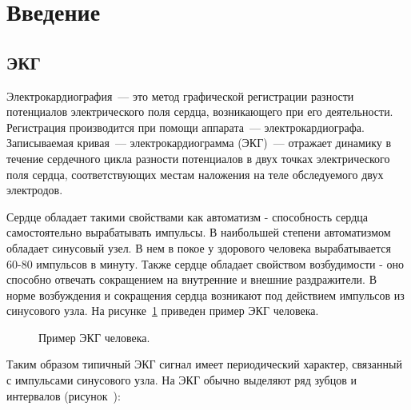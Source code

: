 \documentclass[a4paper,12pt]{extarticle}
\begin{document}
\newpage
\section{Введение}

\subsection{ЭКГ}

Электрокардиография\cite{ClinicalECG93}~--- это метод графической регистрации разности потенциалов электрического поля сердца, возникающего при его деятельности. Регистрация производится при помощи аппарата~--- электрокардиографа. Записываемая кривая~--- электрокардиограмма (ЭКГ)~--- отражает динамику в течение сердечного цикла разности потенциалов в двух точках электрического поля сердца, соответствующих местам наложения на теле обследуемого двух электродов.

Сердце обладает такими свойствами как автоматизм - способность сердца самостоятельно вырабатывать импульсы. В наибольшей степени автоматизмом обладает синусовый узел. В нем в покое у здорового человека вырабатывается 60-80 импульсов в минуту. Также сердце обладает свойством возбудимости - оно способно отвечать сокращением на внутренние и внешние раздражители. В норме возбуждения и сокращения сердца возникают под действием импульсов из синусового узла. На рисунке~\ref{fig:ECGSample} приведен пример ЭКГ человека.

\begin{figure}[H]
  \noindent{}
  \caption{Пример ЭКГ человека.}
  \label{fig:ECGSample}
\end{figure}

Таким образом типичный ЭКГ сигнал имеет периодический характер, связанный с импульсами синусового узла. На ЭКГ обычно выделяют ряд зубцов и интервалов (рисунок~\cite{ECG_ABC03}):
\end{document}
